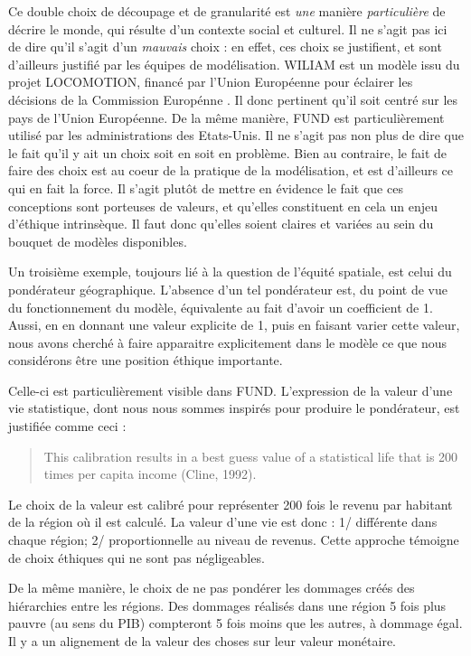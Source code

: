 Ce double choix de découpage et de granularité est \emph{une} manière \emph{particulière} de décrire le monde, qui résulte d'un contexte social et culturel. Il ne s'agit pas ici de dire qu'il s'agit d'un \emph{mauvais} choix : en effet, ces choix se justifient, et sont d'ailleurs justifié par les équipes de modélisation. WILIAM est un modèle issu du projet LOCOMOTION, financé par l'Union Européenne pour éclairer les décisions de la Commission Europénne \autocite{locomotion-h2020_locomotion-h2020wiliam_model_vensim_2024}. Il donc pertinent qu'il soit centré sur les pays de l'Union Européenne. De la même manière, FUND est particulièrement utilisé par les administrations des Etats-Unis. Il ne s'agit pas non plus de dire que le fait qu'il y ait un choix soit en soit en problème. Bien au contraire, le fait de faire des choix est au coeur de la pratique de la modélisation, et est d'ailleurs ce qui en fait la force. Il s'agit plutôt de mettre en évidence le fait que ces conceptions sont porteuses de valeurs, et qu'elles constituent en cela un enjeu d'éthique intrinsèque. Il faut donc qu'elles soient claires et variées au sein du bouquet de modèles disponibles. 

Un troisième exemple, toujours lié à la question de l'équité spatiale, est celui du pondérateur géographique. L'absence d'un tel pondérateur est, du point de vue du fonctionnement du modèle, équivalente au fait d'avoir un coefficient de 1. Aussi, en en donnant une valeur explicite de 1, puis en faisant varier cette valeur, nous avons cherché à faire apparaitre explicitement dans le modèle ce que nous considérons être une position éthique importante. 

Celle-ci est particulièrement visible dans FUND. L'expression de la valeur d'une vie statistique, dont nous nous sommes inspirés pour produire le pondérateur, est justifiée comme ceci : 

\begin{quote}
    This calibration results in a best guess value of a statistical life that is 200 times per capita income (Cline, 1992). 
\end{quote}

Le choix de la valeur est calibré pour représenter 200 fois le revenu par habitant de la région où il est calculé. La valeur d'une vie est donc : 1/ différente dans chaque région; 2/ proportionnelle au niveau de revenus. Cette approche témoigne de choix éthiques qui ne sont pas négligeables. 

De la même manière, le choix de ne pas pondérer les dommages créés des hiérarchies entre les régions. Des dommages réalisés dans une région 5 fois plus pauvre (au sens du PIB) compteront 5 fois moins que les autres, à dommage égal. Il y a un alignement de la valeur des choses sur leur valeur monétaire. 


